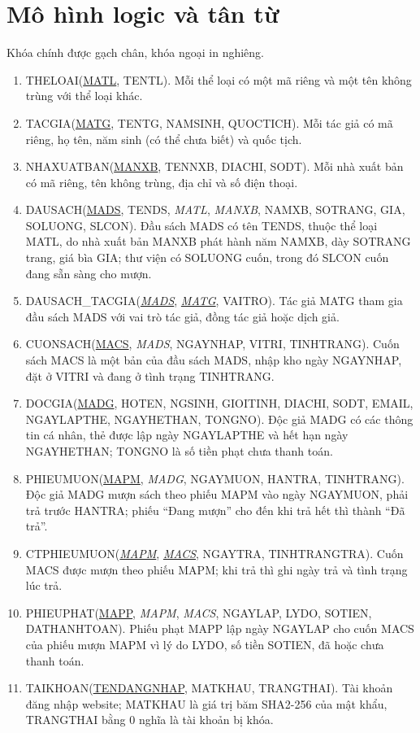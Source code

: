 \documentclass[13pt,a4paper,oneside]{extreport}
\newcommand{\pk}[1]{\underline{#1}}
\newcommand{\fk}[1]{\textit{#1}}
\begin{document}
\section{Mô hình logic và tân từ}
Khóa chính được gạch chân, khóa ngoại in nghiêng.
{\sloppy\begin{enumerate}[leftmargin=1.8em]
\item THELOAI(\pk{MATL}, TENTL). Mỗi thể loại có một mã riêng và một tên không trùng với thể loại khác.
\item TACGIA(\pk{MATG}, TENTG, NAMSINH, QUOCTICH). Mỗi tác giả có mã riêng, họ tên, năm sinh (có thể chưa biết) và quốc tịch.
\item NHAXUATBAN(\pk{MANXB}, TENNXB, DIACHI, SODT). Mỗi nhà xuất bản có mã riêng, tên không trùng, địa chỉ và số điện thoại.
\item DAUSACH(\pk{MADS}, TENDS, \fk{MATL}, \fk{MANXB}, NAMXB, SOTRANG, GIA, SOLUONG, SLCON). Đầu sách MADS có tên TENDS, thuộc thể loại MATL, do nhà xuất bản MANXB phát hành năm NAMXB, dày SOTRANG trang, giá bìa GIA; thư viện có SOLUONG cuốn, trong đó SLCON cuốn đang sẵn sàng cho mượn.
\item DAUSACH\_TACGIA(\pk{\fk{MADS}}, \pk{\fk{MATG}}, VAITRO). Tác giả MATG tham gia đầu sách MADS với vai trò tác giả, đồng tác giả hoặc dịch giả.
\item CUONSACH(\pk{MACS}, \fk{MADS}, NGAYNHAP, VITRI, TINHTRANG). Cuốn sách MACS là một bản của đầu sách MADS, nhập kho ngày NGAYNHAP, đặt ở VITRI và đang ở tình trạng TINHTRANG.
\item DOCGIA(\pk{MADG}, HOTEN, NGSINH, GIOITINH, DIACHI, SODT, EMAIL, NGAYLAPTHE, NGAYHETHAN, TONGNO). Độc giả MADG có các thông tin cá nhân, thẻ được lập ngày NGAYLAPTHE và hết hạn ngày NGAYHETHAN; TONGNO là số tiền phạt chưa thanh toán.
\item PHIEUMUON(\pk{MAPM}, \fk{MADG}, NGAYMUON, HANTRA, TINHTRANG). Độc giả MADG mượn sách theo phiếu MAPM vào ngày NGAYMUON, phải trả trước HANTRA; phiếu ``Đang mượn'' cho đến khi trả hết thì thành ``Đã trả''.
\item CTPHIEUMUON(\pk{\fk{MAPM}}, \pk{\fk{MACS}}, NGAYTRA, TINHTRANGTRA). Cuốn MACS được mượn theo phiếu MAPM; khi trả thì ghi ngày trả và tình trạng lúc trả.
\item PHIEUPHAT(\pk{MAPP}, \fk{MAPM}, \fk{MACS}, NGAYLAP, LYDO, SOTIEN, DATHANHTOAN). Phiếu phạt MAPP lập ngày NGAYLAP cho cuốn MACS của phiếu mượn MAPM vì lý do LYDO, số tiền SOTIEN, đã hoặc chưa thanh toán.
\item TAIKHOAN(\pk{TENDANGNHAP}, MATKHAU, TRANGTHAI). Tài khoản đăng nhập website; MATKHAU là giá trị băm SHA2-256 của mật khẩu, TRANGTHAI bằng 0 nghĩa là tài khoản bị khóa.
\end{enumerate}}
\end{document}
